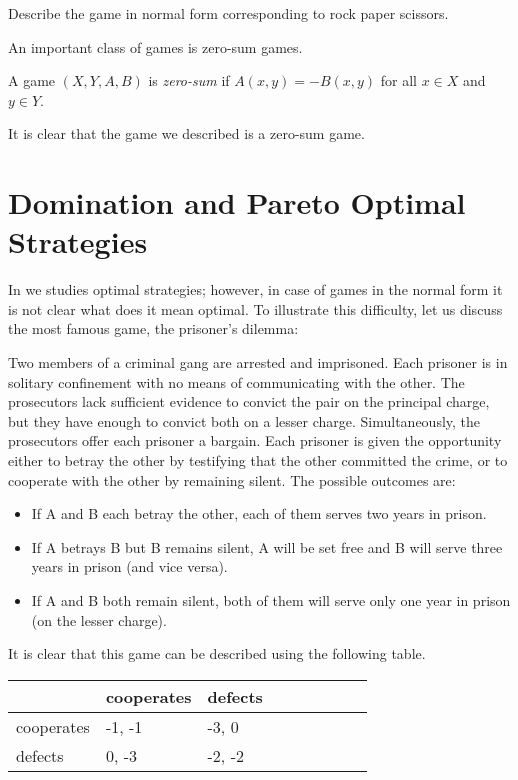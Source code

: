 \begin{exercise}
  Describe the game in normal form corresponding to rock paper scissors.
\end{exercise}

An important class of games is zero-sum games.
\begin{definition}
  A game $(X, Y, A, B)$ is \emph{zero-sum} if $A(x, y) = -B(x, y)$ for all 
  $x \in X$ and $y \in Y$.
\end{definition}
It is clear that the game we described is a zero-sum game.

\section{Domination and Pareto Optimal Strategies}
In  we studies optimal strategies; however, in
case of games in the normal form it is not clear what does it mean optimal. To
illustrate this difficulty, let us discuss the most famous game, the prisoner's
dilemma:
\begin{game}
  Two members of a criminal gang are arrested and imprisoned. Each prisoner is in
  solitary confinement with no means of communicating with the other. The
  prosecutors lack sufficient evidence to convict the pair on the principal
  charge, but they have enough to convict both on a lesser charge. Simultaneously,
  the prosecutors offer each prisoner a bargain. Each prisoner is given the
  opportunity either to betray the other by testifying that the other committed
  the crime, or to cooperate with the other by remaining silent. The possible
  outcomes are:
  \begin{itemize}
    \item If A and B each betray the other, each of them serves two years in
      prison.
    \item If A betrays B but B remains silent, A will be set free and B will serve
      three years in prison (and vice versa).
    \item If A and B both remain silent, both of them will serve only one year in
      prison (on the lesser charge).
  \end{itemize}
\end{game}

It is clear that this game can be described using the following table.
\begin{center}
  \begin{tabular}{l l l  l  l  l  l  l  l}
    \toprule
               & cooperates  & defects   \\
    \midrule
    cooperates & -1, -1      & -3, 0    \\
    defects    & 0, -3       & -2, -2   \\
    \bottomrule
  \end{tabular}
\end{center}


